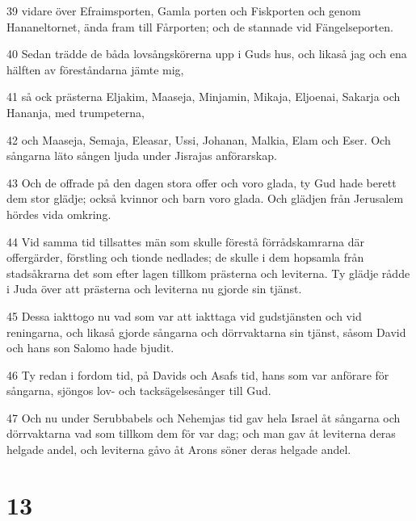 \par 39 vidare över Efraimsporten, Gamla porten och Fiskporten och genom Hananeltornet, ända fram till Fårporten; och de stannade vid Fängelseporten.
\par 40 Sedan trädde de båda lovsångskörerna upp i Guds hus, och likaså jag och ena hälften av föreståndarna jämte mig,
\par 41 så ock prästerna Eljakim, Maaseja, Minjamin, Mikaja, Eljoenai, Sakarja och Hananja, med trumpeterna,
\par 42 och Maaseja, Semaja, Eleasar, Ussi, Johanan, Malkia, Elam och Eser. Och sångarna läto sången ljuda under Jisrajas anförarskap.
\par 43 Och de offrade på den dagen stora offer och voro glada, ty Gud hade berett dem stor glädje; också kvinnor och barn voro glada. Och glädjen från Jerusalem hördes vida omkring.
\par 44 Vid samma tid tillsattes män som skulle förestå förrådskamrarna där offergärder, förstling och tionde nedlades; de skulle i dem hopsamla från stadsåkrarna det som efter lagen tillkom prästerna och leviterna. Ty glädje rådde i Juda över att prästerna och leviterna nu gjorde sin tjänst.
\par 45 Dessa iakttogo nu vad som var att iakttaga vid gudstjänsten och vid reningarna, och likaså gjorde sångarna och dörrvaktarna sin tjänst, såsom David och hans son Salomo hade bjudit.
\par 46 Ty redan i fordom tid, på Davids och Asafs tid, hans som var anförare för sångarna, sjöngos lov- och tacksägelsesånger till Gud.
\par 47 Och nu under Serubbabels och Nehemjas tid gav hela Israel åt sångarna och dörrvaktarna vad som tillkom dem för var dag; och man gav åt leviterna deras helgade andel, och leviterna gåvo åt Arons söner deras helgade andel.

\chapter{13}


